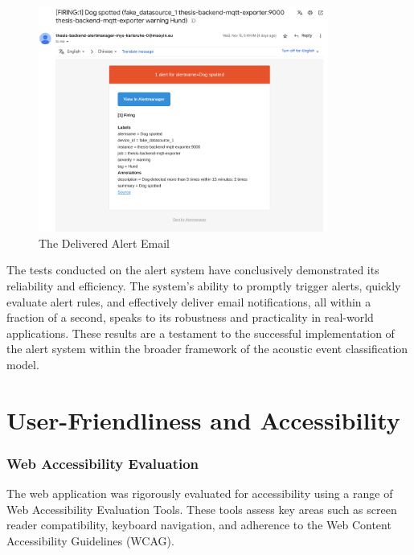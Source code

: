\begin{figure}[htbp]
  \centering
  \includegraphics[width=0.85\textwidth]{Pictures/email}
  \caption{\label{fig:email}The Delivered Alert Email}
\end{figure}

The tests conducted on the alert system have conclusively demonstrated its reliability and efficiency. The system's ability to promptly trigger alerts, quickly evaluate alert rules, and effectively deliver email notifications, all within a fraction of a second, speaks to its robustness and practicality in real-world applications. These results are a testament to the successful implementation of the alert system within the broader framework of the acoustic event classification model.

\section{User-Friendliness and Accessibility}
\subsubsection{Web Accessibility Evaluation}
The web application was rigorously evaluated for accessibility using a range of Web Accessibility Evaluation Tools. These tools assess key areas such as screen reader compatibility, keyboard navigation, and adherence to the Web Content Accessibility Guidelines (WCAG).

